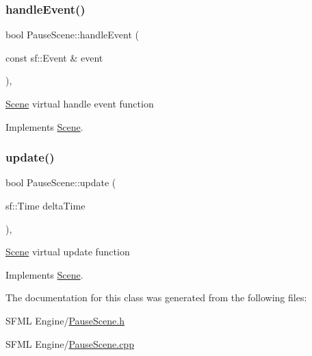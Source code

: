 \subsubsection{\texorpdfstring{handle\+Event()}{handleEvent()}}
{\footnotesize\ttfamily bool Pause\+Scene\+::handle\+Event (\begin{DoxyParamCaption}\item[{const sf\+::\+Event \&}]{event }\end{DoxyParamCaption})\hspace{0.3cm}{\ttfamily [override]}, {\ttfamily [virtual]}}

\hyperlink{class_scene}{Scene} virtual handle event function 

Implements \hyperlink{class_scene_af25e4d2c998aca4e95899fb67488e815}{Scene}.

\mbox{\label{class_pause_scene_a8504260009b4dfb2380785e938e60b4b}} 
\subsubsection{\texorpdfstring{update()}{update()}}
{\footnotesize\ttfamily bool Pause\+Scene\+::update (\begin{DoxyParamCaption}\item[{sf\+::\+Time}]{delta\+Time }\end{DoxyParamCaption})\hspace{0.3cm}{\ttfamily [override]}, {\ttfamily [virtual]}}

\hyperlink{class_scene}{Scene} virtual update function 

Implements \hyperlink{class_scene_a72683c984a1da2ce4f757705e93730f2}{Scene}.



The documentation for this class was generated from the following files\+:\begin{DoxyCompactItemize}
\item 
S\+F\+M\+L Engine/\hyperlink{_pause_scene_8h}{Pause\+Scene.\+h}\item 
S\+F\+M\+L Engine/\hyperlink{_pause_scene_8cpp}{Pause\+Scene.\+cpp}\end{DoxyCompactItemize}
